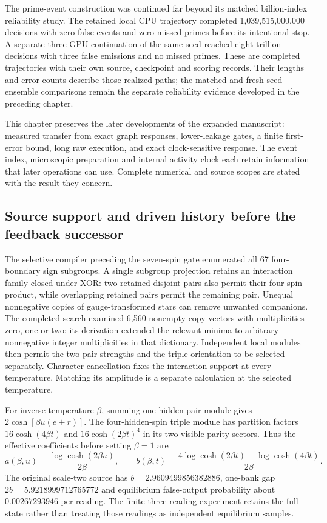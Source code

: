 \label{v3-prime-event}

The prime-event construction was continued far beyond its matched billion-index reliability study. The retained local CPU trajectory completed 1,039,515,000,000 decisions with zero false events and zero missed primes before its intentional stop. A separate three-GPU continuation of the same seed reached eight trillion decisions with three false emissions and no missed primes. These are completed trajectories with their own source, checkpoint and scoring records. Their lengths and error counts describe those realized paths; the matched and fresh-seed ensemble comparisons remain the separate reliability evidence developed in the preceding chapter.

This chapter preserves the later developments of the expanded manuscript: measured transfer from exact graph responses, lower-leakage gates, a finite first-error bound, long raw execution, and exact clock-sensitive response. The event index, microscopic preparation and internal activity clock each retain information that later operations can use. Complete numerical and source scopes are stated with the result they concern.

\subsection{Source support and driven history before the feedback successor}

The selective compiler preceding the seven-spin gate enumerated all 67 four-boundary sign subgroups. A single subgroup projection retains an interaction family closed under XOR: two retained disjoint pairs also permit their four-spin product, while overlapping retained pairs permit the remaining pair. Unequal nonnegative copies of gauge-transformed stars can remove unwanted companions. The completed search examined 6,560 nonempty copy vectors with multiplicities zero, one or two; its derivation extended the relevant minima to arbitrary nonnegative integer multiplicities in that dictionary. Independent local modules then permit the two pair strengths and the triple orientation to be selected separately. Character cancellation fixes the interaction support at every temperature. Matching its amplitude is a separate calculation at the selected temperature.

For inverse temperature $\beta$, summing one hidden pair module gives $2\cosh[\beta u(e+r)]$. The four-hidden-spin triple module has partition factors $16\cosh(4\beta t)$ and $16\cosh(2\beta t)^4$ in its two visible-parity sectors. Thus the effective coefficients before setting $\beta=1$ are
\[
 a(\beta,u)=\frac{\log\cosh(2\beta u)}{2\beta},\qquad
 b(\beta,t)=\frac{4\log\cosh(2\beta t)-\log\cosh(4\beta t)}{2\beta}.
\]
The original scale-two source has $b=2.9609499856382886$, one-bank gap $2b=5.9218999712765772$ and equilibrium false-output probability about $0.00267293946$ per reading. The finite three-reading experiment retains the full state rather than treating those readings as independent equilibrium samples.

